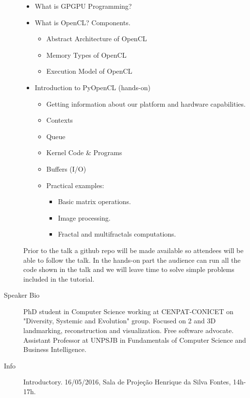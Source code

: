 \begin{description}
\begin{itemize}
   \item What is GPGPU Programming?
   \item What is OpenCL? Components.
   \begin{itemize}
      \item Abstract Architecture of OpenCL
      \item Memory Types of OpenCL
      \item Execution Model of OpenCL
   \end{itemize}
   \item Introduction to PyOpenCL (hands-on)
   \begin{itemize}
      \item Getting information about our platform and hardware capabilities.
      \item Contexts
      \item Queue
      \item Kernel Code \& Programs
      \item Buffers (I/O)
      \item Practical examples:
      \begin{itemize}
         \item Basic matrix operations.
         \item Image processing.
         \item Fractal and multifractals computations.
      \end{itemize}
   \end{itemize}
\end{itemize}

Prior to the talk a github repo will be made available so attendees will be able to follow the talk. In the hands-on part the audience can run all the code shown in the talk and we will leave time to solve simple problems included in the tutorial.
    \item[Speaker Bio] PhD student in Computer Science working at CENPAT-CONICET on "Diversity, Systemic and Evolution" group. Focused on 2 and 3D landmarking, reconstruction and visualization. Free software advocate. Assistant Professor at UNPSJB in Fundamentals of Computer Science and Business Intelligence.
    \item[Info] Introductory. 16/05/2016, Sala de Projeção Henrique da Silva Fontes, 14h-17h.
\end{description} 
